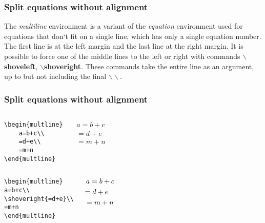 \documentclass[12pt]{beamer}
\begin{document}
\begin{frame}[fragile]
\frametitle{Split equations without alignment}
The \emph{multiline} environment is a variant of the \emph{equation} environment used for equations that don`t fit on a single line, which has only a single equation number. The first line is at the left margin and the last line at the right margin. It is possible to force one of the middle lines to the left or right with commands $\backslash$\textbf{shoveleft}, $\backslash$\textbf{shoveright}. These commands take the entire line as an argument, up to but not including the final $\backslash\backslash$.
\end{frame}
\begin{frame}[fragile]
\frametitle{Split equations without alignment}
    \begin{columns}
        \begin{block}{}
        \begin{verbatim}
\begin{multline}
    a=b+c\\
    =d+e\\
    =m+n
\end{multline}
        \end{verbatim}
        \end{block}
        \begin{block}{}
        \begin{multline}
            a=b+c\\
            =d+e\\
            =m+n
        \end{multline}
        \end{block}
    \end{columns}

    \begin{columns}
        \begin{block}{}
        \begin{verbatim}
\begin{multline}
a=b+c\\
\shoveright{=d+e}\\
=m+n
\end{multline}
        \end{verbatim}
        \end{block}
        \begin{block}{}
        \begin{multline}
        a=b+c\\
        \shoveright{=d+e}\\
        =m+n
        \end{multline}
        \end{block}
    \end{columns}
\end{frame}
\end{document}
